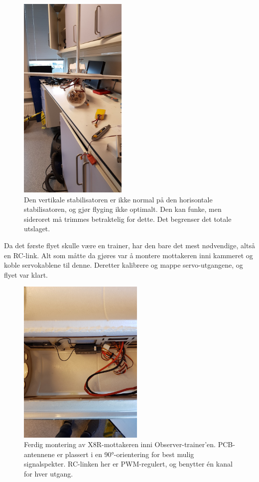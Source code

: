 \documentclass[12pt, a4paper]{report}
\begin{document}
\begin{figure}[ht]
	\centering
	\includegraphics[width = .5\textwidth, height = 10cm]{bilder/skjev_halefinne.jpg}
	\caption{Den vertikale stabilisatoren er ikke normal på den horisontale stabilisatoren, og gjør flyging ikke optimalt. Den kan funke, men sideroret må trimmes betraktelig for dette. Det begrenser det totale utslaget.}
\end{figure}

Da det første flyet skulle være en trainer, har den bare det mest nødvendige, altså en RC-link. Alt som måtte da gjøres var å montere mottakeren inni kammeret og koble servokablene til denne. Deretter kalibrere og mappe servo-utgangene, og flyet var klart.

\begin{figure}[ht]
	\centering
	\includegraphics[height=8cm, width = .6\textwidth]{bilder/mottakermontering.jpg}
	\caption{Ferdig montering av X8R-mottakeren inni Observer-trainer'en. PCB-antennene er plassert i en \ang{90}-orientering for best mulig signalspekter. RC-linken her er PWM-regulert, og benytter én kanal for hver utgang.}
\end{figure}
\newpage
\end{document}
